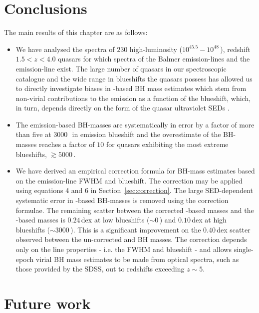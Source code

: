 \section{Conclusions}
\label{sec:conclusions}

The main results of this chapter are as follows: 

\begin{itemize}
\item We have analysed the spectra of $230$ high-luminosity ($10^{45.5}-10^{48}$\,\ergs), redshift $1.5 < z < 4.0$ quasars for which spectra of the Balmer emission-lines and the  emission-line exist.
The large number of quasars in our spectroscopic catalogue and the wide range in  blueshifts the quasars possess has allowed us to directly investigate biases in -based BH mass estimates which stem from non-virial contributions to the  emission as a function of the  blueshift, which, in turn, depends directly on the form of the quasar ultraviolet SEDs \citep{richards11}.
\item The  emission-based BH-masses are systematically in error by a factor of more than five at $3000$\,\kms\, in  emission blueshift and the overestimate of the BH-masses reaches a factor of $10$ for quasars exhibiting the most extreme blueshifts, $\gtrsim5000$\,\kms. 
\item We have derived an empirical correction formula for BH-mass estimates based on the  emission-line FWHM and blueshift.
The correction may be applied using equations 4 and 6 in Section~\ref{sec:correction}.
The large SED-dependent systematic error in -based BH-masses is removed using the correction formulae.
The remaining scatter between the corrected -based masses and the \hans-based masses is $0.24$\,dex at low  blueshifts ($\sim0$\,\kms) and $0.10$\,dex at high blueshifts ($\sim3000$\,\kms). 
This is a significant improvement on the $0.40$\,dex scatter observed between the un-corrected  and \ha BH masses. 
The correction depends only on the  line properties - i.e. the FWHM and blueshift - and allows single-epoch virial BH mass estimates to be made from optical spectra, such as those provided by the SDSS, out to redshifts exceeding $z\sim 5$. 
\end{itemize}

\section{Future work}

